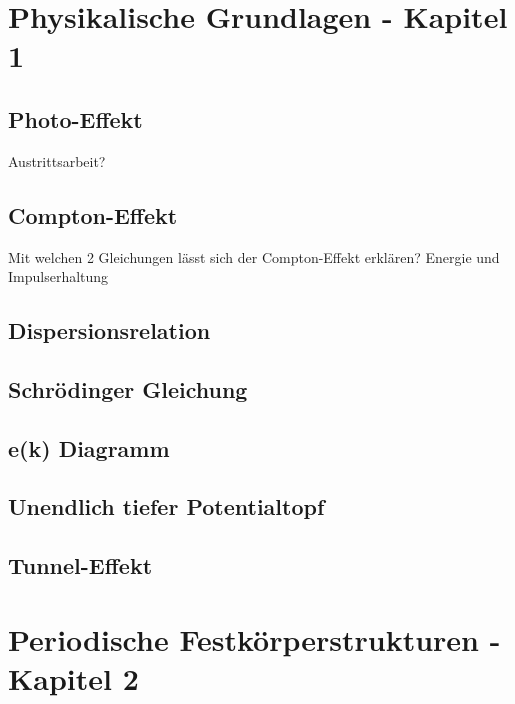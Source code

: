 \documentclass{article}
\begin{document}
\section{Physikalische Grundlagen - Kapitel 1}
\subsection{Photo-Effekt}\label{k1:photoEf}
Austrittsarbeit?
\subsection{Compton-Effekt}\label{k1:comptonEf}
Mit welchen 2 Gleichungen l\"asst sich der Compton-Effekt erkl\"aren? Energie und Impulserhaltung
\subsection{Dispersionsrelation}\label{k1:dispersionsrelation}



\subsection{Schrödinger Gleichung}\label{k1:schrGl}


\subsection{e(k) Diagramm}\label{k1:ekdiag}

\subsection{Unendlich tiefer Potentialtopf}\label{k1:pottopf}

\subsection{Tunnel-Effekt}\label{k1:tunnEf}

\section{Periodische Festkörperstrukturen - Kapitel 2}
\end{document}
